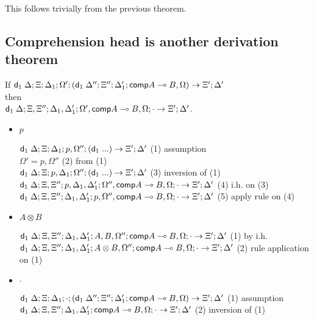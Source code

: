 \documentclass[9pt]{article}
\begin{document}
This follows trivially from the previous theorem.

\subsection{Comprehension head is another derivation theorem}

If $\mathsf{d}_1 \; \Delta; \Xi; \Delta_1; \Omega'; (\mathsf{d}_1 \; \Delta''; \Xi''; \Delta'_1; \mathsf{comp} A \multimap B, \Omega) \rightarrow \Xi'; \Delta'$ \\ then \\ $\mathsf{d}_1 \; \Delta; \Xi, \Xi''; \Delta_1, \Delta'_1; \Omega', \mathsf{comp} A \multimap B, \Omega; \cdot \rightarrow \Xi'; \Delta'$.

\begin{itemize}
\item $p$

$\mathsf{d}_1 \; \Delta; \Xi; \Delta_1; p, \Omega''; (\mathsf{d}_1 \; ...) \rightarrow \Xi'; \Delta'$ \hfill (1) assumption \\
$\Omega' = p, \Omega''$ \hfill (2) from (1) \\
$\mathsf{d}_1 \; \Delta; \Xi; p, \Delta_1; \Omega''; (\mathsf{d}_1 \; ...) \rightarrow \Xi'; \Delta'$ \hfill (3) inversion of (1) \\
$\mathsf{d}_1 \; \Delta; \Xi, \Xi''; p, \Delta_1, \Delta'_1; \Omega'', \mathsf{comp} A \multimap B, \Omega; \cdot \rightarrow \Xi'; \Delta'$ \hfill (4) i.h. on (3) \\
$\mathsf{d}_1 \; \Delta; \Xi, \Xi''; \Delta_1, \Delta'_1; p, \Omega'', \mathsf{comp} A \multimap B, \Omega; \cdot \rightarrow \Xi'; \Delta'$ \hfill (5) apply rule on (4) \\

\item $A \otimes B$

$\mathsf{d}_1 \; \Delta; \Xi, \Xi''; \Delta_1, \Delta'_1; A, B, \Omega''; \mathsf{comp} A \multimap B, \Omega; \cdot \rightarrow \Xi'; \Delta'$ \hfill (1) by i.h. \\
$\mathsf{d}_1 \; \Delta; \Xi, \Xi''; \Delta_1, \Delta'_1; A \otimes B, \Omega''; \mathsf{comp} A \multimap B, \Omega; \cdot \rightarrow \Xi'; \Delta'$ \hfill (2) rule application on (1) \\

\item $\cdot$

$\mathsf{d}_1 \; \Delta; \Xi; \Delta_1; \cdot; (\mathsf{d}_1 \; \Delta''; \Xi''; \Delta'_1; \mathsf{comp} A \multimap B, \Omega) \rightarrow \Xi'; \Delta'$ \hfill (1) assumption \\
$\mathsf{d}_1 \; \Delta; \Xi, \Xi''; \Delta_1, \Delta'_1; \mathsf{comp} A \multimap B, \Omega; \cdot \rightarrow \Xi'; \Delta'$ \hfill (2) inversion of (1) \\

\end{itemize}
\end{document}
